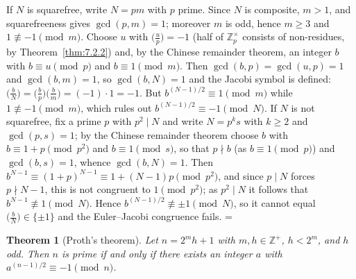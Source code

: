\documentclass[11pt]{article}
\makeatletter
\theoremstyle{ntstyle}
\newtheorem{theorem}{Theorem}[subsection]
\let\nt@closedisplay\]
\def\nt@guardedclose{\@ifnextchar\par{\nt@closeafterpar}{\@ifnextchar\end{\postdisplaypenalty\@M\nt@closedisplay}{\nt@closedisplay}}}
\def\nt@closeafterpar\par{\@ifnextchar\par{\nt@closeafterpar}{\@ifnextchar\end{\postdisplaypenalty\@M\nt@closedisplay\par}{\nt@closedisplay\par}}}
\renewenvironment{proof}[1][\proofname]{\par
  \pushQED{\qed}\normalfont\topsep\medskipamount\edef\nt@afterproof{\@endparpenalty=\the\@endparpenalty\relax}\@beginparpenalty\@M\@endparpenalty\@M\let\]\nt@guardedclose\trivlist\item[]\textit{#1\@addpunct{.}} \ignorespaces}{\ifvmode\addpenalty\@M\fi\popQED\nt@afterproof\endtrivlist\@endpefalse}
\newcommand{\legs}[2]{\bigl(\tfrac{#1}{#2}\bigr)}
\newcommand{\ZmodUnits}[1]{\mathbb{Z}_{#1}^{\times}}
\makeatother
\begin{document}
\begin{proof} If $N$ is squarefree, write $N=pm$ with $p$
	prime. Since $N$ is composite, $m>1$, and squarefreeness gives $\gcd(p,
		m)=1$; moreover $m$ is odd, hence $m\ge3$ and $1\not\equiv-1\pmod{m}$.
	Choose $u$ with $\legs{u}{p}=-1$ (half of $\ZmodUnits{p}$ consists
	of non-residues, by Theorem~\ref{thm:7.2.2}) and, by the Chinese remainder theorem, an
	integer $b$ with $b\equiv u\pmod{p}$ and $b\equiv1\pmod{m}$. Then
	$\gcd(b, p)=\gcd(u, p)=1$ and $\gcd(b, m)=1$, so $\gcd(b, N)=1$ and the
	Jacobi symbol is defined:
	$\legs{b}{N}=\legs{b}{p}\legs{b}{m}=(-1)\cdot1=-1$. But
	$b^{(N-1)/2}\equiv1\pmod{m}$ while $1\not\equiv-1\pmod{m}$, which rules
	out $b^{(N-1)/2}\equiv-1\pmod{N}$.
		If $N$ is not squarefree, fix a prime $p$ with $p^{2}\mid N$ and write $N=p^{k}s$ with $k\ge2$
		and $\gcd(p, s)=1$; by the Chinese remainder theorem choose $b$ with $b\equiv1+p\pmod{p^{2}}$ and
		$b\equiv1\pmod{s}$, so that $p\nmid b$ (as $b\equiv1\pmod{p}$) and $\gcd(b, s)=1$, whence
		$\gcd(b, N)=1$.
		Then $b^{N-1}\equiv(1+p)^{N-1}\equiv1+(N-1)p\pmod{p^{2}}$, and since $p\mid N$ forces $p\nmid
		N-1$, this is not congruent to $1\pmod{p^{2}}$; as $p^{2}\mid N$ it follows that
		$b^{N-1}\not\equiv1\pmod{N}$.
		Hence $b^{(N-1)/2}\not\equiv\pm1\pmod{N}$, so it cannot equal $\legs{b}{N}\in\{\pm1\}$ and the
		Euler--Jacobi congruence fails.
\end{proof}
\begin{theorem}[Proth's theorem]\label{thm:9.1.6} Let $n=2^{m}h+1$
	with $m,h\in\mathbb{Z}^+$, $h<2^{m}$, and $h$ odd. Then $n$ is prime if and only if
	there exists an integer $a$ with $a^{(n-1)/2}\equiv-1\pmod{n}$.
\end{theorem}
\end{document}
